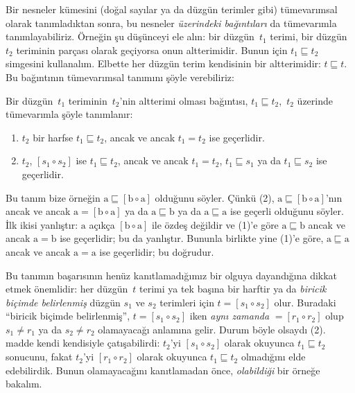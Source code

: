 



Bir nesneler kümesini (doğal sayılar ya da düzgün terimler gibi)
tümevarımsal olarak tanımladıktan sonra, bu nesneler \emph{üzerindeki
bağıntıları} da tümevarımla tanımlayabiliriz. Örneğin şu düşünceyi ele
alın: bir düzgün~$t_1$ terimi, bir düzgün~$t_2$ teriminin parçası olarak
geçiyorsa onun altterimidir. Bunun için $t_1 \sqsubseteq t_2$ simgesini
kullanalım. Elbette her düzgün terim kendisinin bir altterimidir: $t
\sqsubseteq t$. Bu bağıntının tümevarımsal tanımını şöyle verebiliriz:

\begin{defn}
  Bir düzgün~$t_1$ teriminin~$t_2$'nin altterimi olması bağıntısı, $t_1
  \sqsubseteq t_2$,~$t_2$ üzerinde tümevarımla şöyle tanımlanır:
  \begin{enumerate}
  \item $t_2$ bir harfse $t_1 \sqsubseteq t_2$, ancak ve ancak $t_1 = t_2$
    ise geçerlidir.
  \item $t_2$, $[s_1 \circ s_2]$ ise $t_1 \sqsubseteq t_2$, ancak ve
    ancak $t_1 = t_2$, $t_1 \sqsubseteq s_1$ ya da $t_1 \sqsubseteq s_2$
    ise geçerlidir.
  \end{enumerate}
\end{defn}

Bu tanım bize örneğin $\mathrm{a} \sqsubseteq [\mathrm{b} \circ
\mathrm{a}]$ olduğunu söyler. Çünkü (2), $\mathrm{a} \sqsubseteq
[\mathrm{b} \circ \mathrm{a}]$'nın ancak ve ancak $\mathrm{a} =
[\mathrm{b} \circ \mathrm{a}]$ ya da $\mathrm{a} \sqsubseteq
\mathrm{b}$ ya da $\mathrm{a} \sqsubseteq \mathrm{a}$ ise geçerli
olduğunu söyler. İlk ikisi yanlıştır: $\mathrm{a}$ açıkça $[\mathrm{b}
\circ \mathrm{a}]$ ile özdeş değildir ve (1)'e göre $\mathrm{a}
\sqsubseteq \mathrm{b}$ ancak ve ancak $\mathrm{a} = \mathrm{b}$ ise
geçerlidir; bu da yanlıştır. Bununla birlikte yine (1)'e göre,
$\mathrm{a} \sqsubseteq \mathrm{a}$ ancak ve ancak $\mathrm{a} =
\mathrm{a}$ ise geçerlidir; bu doğrudur.

Bu tanımın başarısının henüz kanıtlamadığımız bir olguya dayandığına
dikkat etmek önemlidir: her düzgün~$t$ terimi ya tek başına bir harftir
ya da \emph{biricik biçimde belirlenmiş} düzgün $s_1$ ve $s_2$ terimleri
için $t = [s_1 \circ s_2]$ olur. Buradaki ``biricik biçimde belirlenmiş'',
$t = [s_1 \circ s_2]$ iken \emph{aynı zamanda} $= [r_1 \circ r_2]$ olup
$s_1 \neq r_1$ ya da $s_2 \neq r_2$ olamayacağı anlamına gelir. Durum
böyle olsaydı (2). madde kendi kendisiyle
çatışabilirdi: $t_2$'yi $[s_1 \circ s_2]$ olarak okuyunca $t_1
\sqsubseteq t_2$ sonucunu, fakat $t_2$'yi $[r_1 \circ r_2]$ olarak
okuyunca $t_1 \sqsubseteq t_2$ olmadığını elde edebilirdik. Bunun
olamayacağını kanıtlamadan önce, \emph{olabildiği} bir örneğe bakalım.

